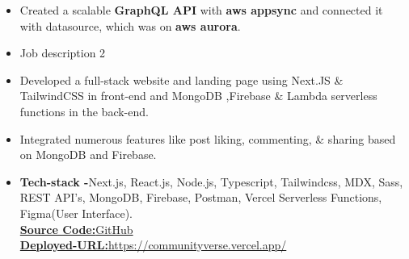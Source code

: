 \documentclass[10pt,a4paper,ragged2e]{altacv}
\begin{document}
\begin{itemize}
\item Created a scalable \textbf{GraphQL API} with \textbf{aws appsync} and connected it with datasource, which was on \textbf{aws aurora}.
\item Job description 2
\end{itemize}
\begin{itemize}
\item Developed a full-stack website and landing page using Next.JS \& TailwindCSS in front-end and MongoDB ,Firebase \& Lambda serverless functions in the back-end.
\item Integrated numerous features like post liking, commenting, \& sharing based on MongoDB and Firebase.
\item \textbf{Tech-stack -}Next.js, React.js, Node.js, Typescript, Tailwindcss, MDX, Sass, REST API's, MongoDB, Firebase, Postman, Vercel Serverless Functions, Figma(User Interface).
\\
 \href{https://github.com/ghulamyazdani/CommunityVerse}{\textbf{Source Code:}GitHub}
 \\
 \href{https://communityverse.vercel.app/}{\textbf{Deployed-URL:}https://communityverse.vercel.app/}

\end{itemize}
\smallskip
\end{document}
